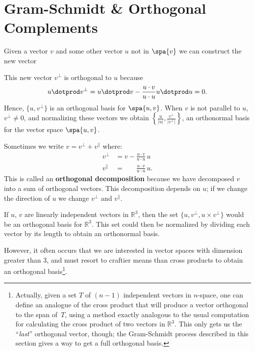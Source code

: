 %



\section{Gram-Schmidt \& Orthogonal Complements}\label{gramschmidt}


Given a vector $v$ and some other vector $u$ not in  $\spa\{v\} $ we can construct the new vector 
\begin{center}
\hypertarget{projectionpic}{}
\end{center}
This new vector $v^\perp$ is orthogonal to $u$ because 
\[
u\dotprod v^\perp = u\dotprod v - \frac{u\cdot v}{u\cdot u}u\dotprod u = 0.
\]
Hence, $\{u, v^\perp\}$ is an orthogonal basis for $\spa \{u,v\}$.  When $v$ is not parallel to $u$, $v^\perp \neq 0$, and normalizing these vectors we obtain $\left\{\frac{u}{|u|}, \frac{v^\perp}{|v^\perp|} \right\}$, an orthonormal basis for the vector space $\spa\{u,v\}$.

Sometimes we write $v = v^\perp + v^\parallel$ where:
\begin{align*}
v^\perp &= v-\frac{u\cdot v}{u\cdot u}\, u \\[1mm]
v^\parallel &= \phantom{v-}\frac{u\cdot v}{u\cdot u}\, u.
\end{align*}
This is called an {\bfseries orthogonal decomposition} because we have decomposed $v$ into a sum of orthogonal vectors.  This decomposition depends on $u$; if we change the direction of $u$ we change $v^\perp$ and $v^\parallel$.

If $u$, $v$ are linearly independent vectors in $\mathbb{R}^3$, then the set $\{u, v^\perp, u\times v^\perp \}$ would be an orthogonal basis for $\mathbb{R}^3$.  This set could then be normalized by dividing each vector by its length to obtain an orthonormal basis.

However, it often occurs that we are interested in vector spaces with dimension greater than $3$, and must resort to craftier means than cross products to obtain an orthogonal basis\footnote{Actually, given a set $T$ of $(n-1)$ independent vectors in $n$-space, one can define an analogue of the cross product that will produce a vector orthogonal to the span of~$T$, using a method exactly analogous to the usual computation for calculating the cross product of two vectors in $\mathbb{R}^3$.  This only gets us the ``\emph{last}'' orthogonal vector, though; the Gram-Schmidt process described in this section gives a way to get a full orthogonal basis.}.

